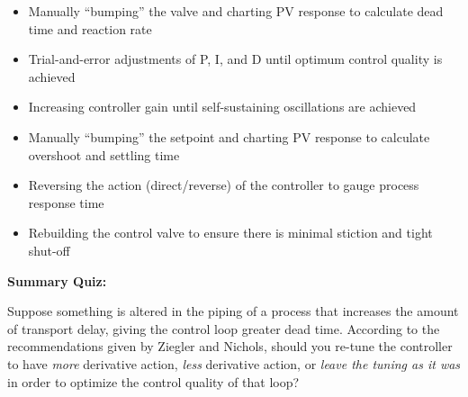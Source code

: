 \begin{itemize}
\item{} Manually ``bumping'' the valve and charting PV response to calculate dead time and reaction rate
\vskip 5pt 
\item{} Trial-and-error adjustments of P, I, and D until optimum control quality is achieved
\vskip 5pt 
\item{} Increasing controller gain until self-sustaining oscillations are achieved
\vskip 5pt 
\item{} Manually ``bumping'' the setpoint and charting PV response to calculate overshoot and settling time
\vskip 5pt 
\item{} Reversing the action (direct/reverse) of the controller to gauge process response time
\vskip 5pt 
\item{} Rebuilding the control valve to ensure there is minimal stiction and tight shut-off
\end{itemize}











\vfil \eject

\noindent
{\bf Summary Quiz:}

Suppose something is altered in the piping of a process that increases the amount of transport delay, giving the control loop greater dead time.  According to the recommendations given by Ziegler and Nichols, should you re-tune the controller to have {\it more} derivative action, {\it less} derivative action, or {\it leave the tuning as it was} in order to optimize the control quality of that loop?





